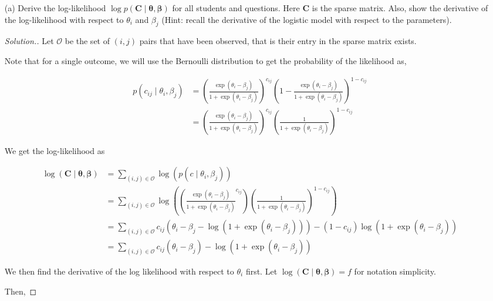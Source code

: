 \documentclass[11pt]{article}
\begin{document}
\begin{enumerate}

\item[(a)] Derive the log-likelihood $\log p(\mathbf{C}\mid\boldsymbol{\theta},\boldsymbol{\beta})$ for all students and questions. Here $\mathbf{C}$ is the sparse matrix. Also, show the derivative of the log-likelihood with respect to $\theta_i$ and $\beta_j$ (Hint: recall the derivative of the logistic model with respect to the parameters).

\begin{proof}[Solution.]
    Let $\mathcal{O}$ be the set of $(i, j)$ pairs that have been observed, that is their entry in the sparse matrix exists.

    Note that for a single outcome, we will use the Bernoulli distribution to get the probability of the likelihood as,

    \begin{align*}
        p(c_{ij} \mid \theta_i, \beta_j) &= (\frac{\exp(\theta_i - \beta_j)}{1 + \exp(\theta_i - \beta_j)})^{c_{ij}}(1 - \frac{\exp(\theta_i - \beta_j)}{1 + \exp(\theta_i - \beta_j)})^{1 - c_{ij}} \\
        &= (\frac{\exp(\theta_i - \beta_j)}{1 + \exp(\theta_i - \beta_j)})^{c_{ij}}(\frac{1}{1 + \exp(\theta_i - \beta_j)})^{1 - c_{ij}}
    \end{align*}

    We get the log-likelihood as 

    \begin{align*}
        \log(\mathbf{C} \mid \boldsymbol{\theta}, \boldsymbol{\beta}) &= \sum_{(i, j) \in \mathcal{O}}\log(p(c\mid \theta_i, \beta_j)) \\
        &= \sum_{(i, j) \in \mathcal{O}}\log((\frac{\exp(\theta_i - \beta_j)}{1 + \exp(\theta_i - \beta_j)}^{c_{ij}})(\frac{1}{1 + \exp(\theta_i - \beta_j)})^{1 - c_{ij}}) \\
        &= \sum_{(i, j) \in \mathcal{O}} c_{ij}(\theta_i - \beta_j - \log(1+\exp(\theta_i - \beta_j)))-(1-c_{ij})\log(1 + \exp(\theta_i - \beta_j)) \\
        &= \sum_{(i, j) \in \mathcal{O}}c_{ij}(\theta_i - \beta_j) - \log(1 + \exp(\theta_i - \beta_j))
    \end{align*}

    We then find the derivative of the log likelihood with respect to $\theta_i$ first. Let $\log(\mathbf{C} \mid \boldsymbol{\theta}, \boldsymbol{\beta}) = f$ for notation simplicity.

    Then, 


\end{proof}
\end{enumerate}
\end{document}
